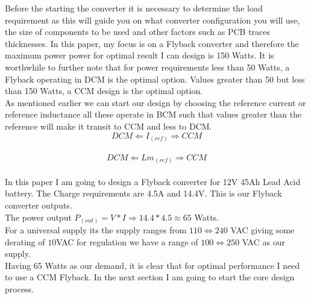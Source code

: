 \documentclass{article}
\begin{document}
    Before the starting the converter it is necessary to determine the load requirement as this will guide you on what converter configuration you will use,
    the size of components to be used and other factors such as PCB traces thicknesses. In this paper, my focus is on a Flyback converter and therefore the maximum power
    power for optimal result I can design is 150 Watts. It is worthwhile to further note that for power requirements less than 50 Watts, a Flyback operating in DCM is the optimal option. Values greater than 50 but less than 150 Watts, a CCM 
    design is the optimal option.\\
    As mentioned earlier we can start our design by choosing the reference current or reference inductance all these operate in BCM such that values greater than the reference will make it transit to CCM and less to DCM.\\
    \begin{equation*}
        DCM \Longleftarrow I_(ref) \Longrightarrow CCM
    \end{equation*}
    \\    \begin{equation*}
        DCM \Longleftarrow Lm_(ref) \Longrightarrow CCM
    \end{equation*}
    \\
    In this paper I am going to design a Flyback converter for 12V 45Ah Lead Acid battery. The Charge requirements are 4.5A and 14.4V.  This is our Flyback converter outputs.\\
    The power output $P_(out) = V * I \Longrightarrow 14.4 * 4.5 \approx 65 $ Watts.
    \\
    For a universal supply its the supply ranges from $110 \Leftrightarrow 240$ VAC giving some derating of $10$VAC for regulation we have a range of $100 \Leftrightarrow 250$ VAC as our supply.
    \\
    Having 65 Watts as our demand, it is clear that for optimal performance I need to use a CCM Flyback. In the next section I am going to start the core design process. 
\end{document}
